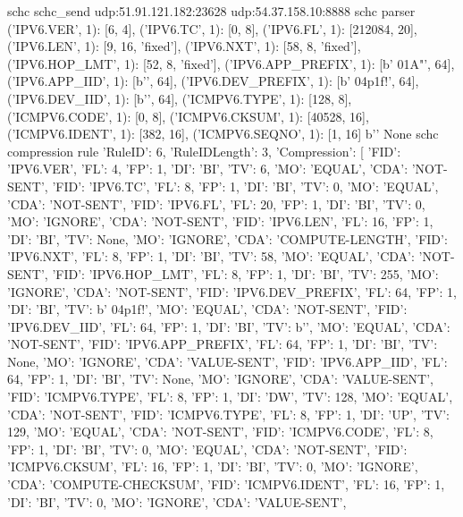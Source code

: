 \begin{termc}[backgroundcolor=\color{palerod}, basicstyle=\ttfamily\tiny]
schc schc_send udp:51.91.121.182:23628 udp:54.37.158.10:8888
schc parser {('IPV6.VER', 1): [6, 4], 
             ('IPV6.TC', 1): [0, 8], 
             ('IPV6.FL', 1): [212084, 20], 
             ('IPV6.LEN', 1): [9, 16, 'fixed'], 
             ('IPV6.NXT', 1): [58, 8, 'fixed'], 
             ('IPV6.HOP_LMT', 1): [52, 8, 'fixed'], 
             ('IPV6.APP_PREFIX', 1): [b' \x01A"', 64], 
             ('IPV6.APP_IID', 1): [b'', 64],
             ('IPV6.DEV_PREFIX', 1): [b' \x04p\x1f!', 64], 
             ('IPV6.DEV_IID', 1): [b'', 64], 
             ('ICMPV6.TYPE', 1): [128, 8], 
             ('ICMPV6.CODE', 1): [0, 8], 
             ('ICMPV6.CKSUM', 1): [40528, 16], 
             ('ICMPV6.IDENT', 1): [382, 16], 
             ('ICMPV6.SEQNO', 1): [1, 16]} b'' None
schc compression rule {'RuleID': 6, 'RuleIDLength': 3, 'Compression': [
    {'FID': 'IPV6.VER', 'FL': 4, 'FP': 1, 'DI': 'BI', 'TV': 6, 'MO': 'EQUAL', 'CDA': 'NOT-SENT'}, 
    {'FID': 'IPV6.TC', 'FL': 8, 'FP': 1, 'DI': 'BI', 'TV': 0, 'MO': 'EQUAL', 'CDA': 'NOT-SENT'}, 
    {'FID': 'IPV6.FL', 'FL': 20, 'FP': 1, 'DI': 'BI', 'TV': 0, 'MO': 'IGNORE', 'CDA': 'NOT-SENT'}, 
    {'FID': 'IPV6.LEN', 'FL': 16, 'FP': 1, 'DI': 'BI', 'TV': None, 'MO': 'IGNORE', 'CDA': 'COMPUTE-LENGTH'}, 
    {'FID': 'IPV6.NXT', 'FL': 8, 'FP': 1, 'DI': 'BI', 'TV': 58, 'MO': 'EQUAL', 'CDA': 'NOT-SENT'}, 
    {'FID': 'IPV6.HOP_LMT', 'FL': 8, 'FP': 1, 'DI': 'BI', 'TV': 255, 'MO': 'IGNORE', 'CDA': 'NOT-SENT'}, 
    {'FID': 'IPV6.DEV_PREFIX', 'FL': 64, 'FP': 1, 'DI': 'BI', 'TV': b' \x04p\x1f!', 'MO': 'EQUAL', 'CDA': 'NOT-SENT'}, 
    {'FID': 'IPV6.DEV_IID', 'FL': 64, 'FP': 1, 'DI': 'BI', 'TV': b'', 'MO': 'EQUAL', 'CDA': 'NOT-SENT'}, 
    {'FID': 'IPV6.APP_PREFIX', 'FL': 64, 'FP': 1, 'DI': 'BI', 'TV': None, 'MO': 'IGNORE', 'CDA': 'VALUE-SENT'}, 
    {'FID': 'IPV6.APP_IID', 'FL': 64, 'FP': 1, 'DI': 'BI', 'TV': None, 'MO': 'IGNORE', 'CDA': 'VALUE-SENT'}, 
    {'FID': 'ICMPV6.TYPE', 'FL': 8, 'FP': 1, 'DI': 'DW', 'TV': 128, 'MO': 'EQUAL', 'CDA': 'NOT-SENT'}, 
    {'FID': 'ICMPV6.TYPE', 'FL': 8, 'FP': 1, 'DI': 'UP', 'TV': 129, 'MO': 'EQUAL', 'CDA': 'NOT-SENT'}, 
    {'FID': 'ICMPV6.CODE', 'FL': 8, 'FP': 1, 'DI': 'BI', 'TV': 0, 'MO': 'EQUAL', 'CDA': 'NOT-SENT'}, 
    {'FID': 'ICMPV6.CKSUM', 'FL': 16, 'FP': 1, 'DI': 'BI', 'TV': 0, 'MO': 'IGNORE', 'CDA': 'COMPUTE-CHECKSUM'}, 
    {'FID': 'ICMPV6.IDENT', 'FL': 16, 'FP': 1, 'DI': 'BI', 'TV': 0, 'MO': 'IGNORE', 'CDA': 'VALUE-SENT'}, 
}
\end{termc}
